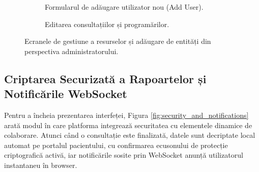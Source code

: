 \begin{figure}[H]
    \centering
    \begin{subfigure}[b]{0.49\textwidth}
        \centering
        \color{red}
        \caption{Formularul de adăugare utilizator nou (Add User).}
        \label{fig:screenshot_admin_add_user}
    \end{subfigure}
    \hfill
    \begin{subfigure}[b]{0.49\textwidth}
        \centering
        \color{red}
        \caption{Editarea consultațiilor și programărilor.}
        \label{fig:screenshot_admin_edits}
    \end{subfigure}
    \caption{Ecranele de gestiune a resurselor și adăugare de entități din perspectiva administratorului.}
    \label{fig:admin_forms}
\end{figure}

\subsection{Criptarea Securizată a Rapoartelor și Notificările WebSocket}
Pentru a încheia prezentarea interfeței, Figura \ref{fig:security_and_notifications} arată modul în care platforma integrează securitatea cu elementele dinamice de colaborare. Atunci când o consultație este finalizată, datele sunt decriptate local automat pe portalul pacientului, cu confirmarea ecusonului de protecție criptografică activă, iar notificările sosite prin WebSocket anunță utilizatorul instantaneu în browser.

